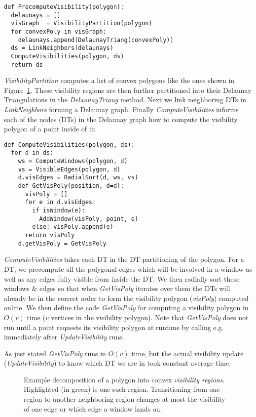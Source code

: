 \begin{verbatim}
def PrecomputeVisibility(polygon):
  delaunays = []
  visGraph  = VisibilityPartition(polygon)
  for convexPoly in visGraph:
    delaunays.append(DelaunayTriang(convexPoly))
  ds = LinkNeighbors(delaunays)
  ComputeVisibilities(polygon, ds)
  return ds
\end{verbatim}

\emph{VisibilityPartition} computes a list of convex polygons like the
ones shown in Figure~\ref{fig:visibility-regions}. These visibility
regions are then further partitioned into their Delaunay Triangulations
in the \emph{DelaunayTriang} method. Next we link neighboring
DTs in \emph{LinkNeighbors} forming a Delaunay graph. Finally
\emph{ComputeVisibilities} informs each of the nodes (DTs) in the
Delaunay graph how to compute the visibility polygon of a point inside
of it:

\begin{verbatim}
def ComputeVisibilities(polygon, ds):
  for d in ds:
    ws = ComputeWindows(polygon, d)
    vs = VisibleEdges(polygon, d)
    d.visEdges = RadialSort(d, ws, vs)
    def GetVisPoly(position, d=d):
      visPoly = []
      for e in d.visEdges:
        if isWindow(e):
          AddWindow(visPoly, point, e)
        else: visPoly.append(e)
      return visPoly
    d.getVisPoly = GetVisPoly
\end{verbatim}

\emph{ComputeVisibilities} takes each DT in the DT-partitioning of
the polygon. For a DT, we precompute all the polygonal edges which
will be involved in a window as well as any edges fully visible from
inside the DT. We then radially sort these windows \& edges so that
when \emph{GetVisPoly} iterates over them the DTs will already be in
the correct order to form the visibility polygon (\emph{visPoly})
computed online. We then define the code \emph{GetVisPoly} for computing
a visibility polygon in $O(v)$ time ($v$ vertices in the visibility
polygon). Note that \emph{GetVisPoly} does not run until a point
requests its visibility polygon at runtime by calling
 e.g. immediately after
\emph{UpdateVisibility} runs.

As just stated \emph{GetVisPoly} runs in $O(v)$ time, but the
actual visibility update (\emph{UpdateVisibility}) to know which
DT we are in took constant average time.

\begin{figure}
  \begin{center}
    
  \end{center}
  \caption{\label{fig:visibility-regions}
    Example decomposition of a polygon into convex
    \emph{visibility regions}. Highlighted (in green) is one such
    region. Transitioning from one region to another neighboring
    region changes at most the visibility of one edge or which edge
    a window lands on.
  }
\end{figure}

